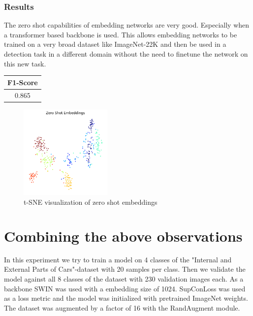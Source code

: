 \documentclass[12pt,a4paper]{report}
\begin{document}
\subsubsection{Results}
\begin{minipage}{0.8\textwidth}
	The zero shot capabilities of embedding networks are very good.
	Especially when a transformer based backbone is used.
	This allows embedding networks to be trained on a very broad dataset like ImageNet-22K\cite{imagenet} and then be used in a detection task in a different domain without the need to finetune the network on this new task.
	
\end{minipage}
\hfill
\begin{minipage}{0.15\textwidth}
	\begin{tabular}{ | c | }
		\hline
		F1-Score \\ 
		\hline
		0.865  \\ 
		\hline
	\end{tabular}
\end{minipage}	

\begin{figure}[hb]
	\centering
	\includegraphics[width=0.4\textwidth]{../plots/zero_shot_embeddings.png}
	\caption{t-SNE visualization of zero shot embeddings}
\end{figure}

\newpage

\section{Combining the above observations}

In this experiment we try to train a model on 4 classes of the "Internal and External Parts of Cars"-dataset with 20 samples per class.
Then we validate the model against all 8 classes of the dataset with 230 validation images each.
As a backbone SWIN was used with a embedding size of 1024.
SupConLoss was used as a loss metric and the model was initialized with pretrained ImageNet weights.
The dataset was augmented by a factor of 16 with the RandAugment module.
\end{document}
